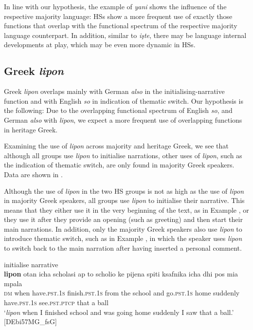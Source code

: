 \documentclass[output=paper,colorlinks,citecolor=brown]{langscibook}
\begin{document}
\noindent In line with our hypothesis, the example of \textit{yani} shows the influence of the respective majority language: HSs show a more frequent use of exactly those functions that overlap with the functional spectrum of the respective majority language counterpart. In addition, similar to \textit{işte}, there may be language internal developments at play, which may be even more dynamic in HSs.

\subsection{Greek \emph{lipon}}
\label{sec:sub:labrenzetal:Greek_lipon}
Greek \textit{lipon} overlaps mainly with German \textit{also} in the initialising-narrative function and with English \textit{so} in indication of thematic switch. Our hypothesis is the following:  
Due to the overlapping functional spectrum of English \textit{so}, and German \textit{also} with \textit{lipon}, we expect a more frequent use of overlapping functions in heritage Greek.

Examining the use of \textit{lipon} across majority and heritage Greek, we see that although all groups use \textit{lipon} to initialise narrations, other uses of \textit{lipon}, such as the indication of thematic switch, are only found in majority Greek speakers. Data are shown in .

Although the use of \textit{lipon} in the two HS groups is not as high as the use of \textit{lipon} in majority Greek speakers, all groups use \textit{lipon} to initialise their narrative. This means that they either use it in the very beginning of the text, as in Example , or they use it after they provide an opening (such as greeting) and then start their main narrations. In addition, only the majority Greek speakers also use \textit{lipon} to introduce thematic switch, such as in Example , in which the speaker uses \textit{lipon} to switch back to the main narration after having inserted a personal comment. 

\ea initialise narrative\label{ex:labrenzetal:22}\\
\gll \textbf{lipon} otan icha scholasi ap to scholio ke pijena spiti ksafnika icha dhi pos mia mpala \\ \textsc{dm} when have.\textsc{pst.1s} finish.\textsc{pst.1s} from the school and go.\textsc{pst.1s} home suddenly have.\textsc{pst.1s} see.\textsc{pst.ptcp} that a ball\\
\glt ‘\textit{lipon} when I finished school and was going home suddenly I saw that a ball.' \hfill[DEbi57MG\_fsG]
\z
\end{document}

